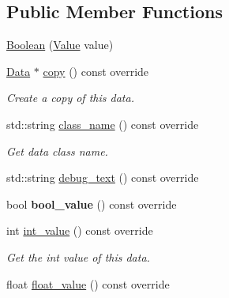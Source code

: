 \subsection*{Public Member Functions}
\begin{DoxyCompactItemize}
\item 
\hyperlink{classcreek_1_1_boolean_a6c92929fbc86ca1eb68943e9cd150016}{Boolean} (\hyperlink{classcreek_1_1_boolean_a7955c007f37b8a29318e49dc8b5bcb13}{Value} value)
\item 
\hyperlink{classcreek_1_1_data}{Data} $\ast$ \hyperlink{classcreek_1_1_boolean_afd7e8c2fea154d3bd7b08cf68ff3ee09}{copy} () const  override\hypertarget{classcreek_1_1_boolean_afd7e8c2fea154d3bd7b08cf68ff3ee09}{}\label{classcreek_1_1_boolean_afd7e8c2fea154d3bd7b08cf68ff3ee09}

\begin{DoxyCompactList}\small\item\em Create a copy of this data. \end{DoxyCompactList}\item 
std\+::string \hyperlink{classcreek_1_1_boolean_ae9b4354153903845327e9a0429f4f4b7}{class\+\_\+name} () const  override\hypertarget{classcreek_1_1_boolean_ae9b4354153903845327e9a0429f4f4b7}{}\label{classcreek_1_1_boolean_ae9b4354153903845327e9a0429f4f4b7}

\begin{DoxyCompactList}\small\item\em Get data class name. \end{DoxyCompactList}\item 
std\+::string \hyperlink{classcreek_1_1_boolean_a4cb36d7dd280511ae75aec5d8c1ef082}{debug\+\_\+text} () const  override
\item 
bool {\bfseries bool\+\_\+value} () const  override\hypertarget{classcreek_1_1_boolean_a2aa15983e50e77eecbf8b760d889131c}{}\label{classcreek_1_1_boolean_a2aa15983e50e77eecbf8b760d889131c}

\item 
int \hyperlink{classcreek_1_1_boolean_a48f09cc54cbddfab2453b08b74d681f8}{int\+\_\+value} () const  override\hypertarget{classcreek_1_1_boolean_a48f09cc54cbddfab2453b08b74d681f8}{}\label{classcreek_1_1_boolean_a48f09cc54cbddfab2453b08b74d681f8}

\begin{DoxyCompactList}\small\item\em Get the int value of this data. \end{DoxyCompactList}\item 
float \hyperlink{classcreek_1_1_boolean_ae26015db28b5d212ac1bfefe4d59e7f5}{float\+\_\+value} () const  override\hypertarget{classcreek_1_1_boolean_ae26015db28b5d212ac1bfefe4d59e7f5}{}\label{classcreek_1_1_boolean_ae26015db28b5d212ac1bfefe4d59e7f5}


\end{DoxyCompactItemize}
